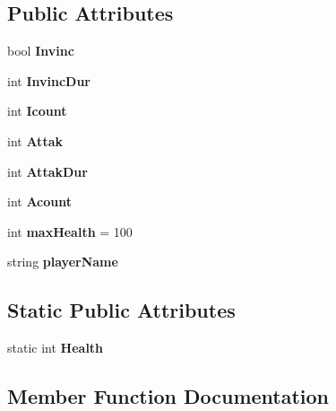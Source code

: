\subsection*{Public Attributes}
\begin{DoxyCompactItemize}
\item 
\mbox{\label{class_i_player_a52228afb290f3823a055ac7e1b62552f}} 
bool {\bfseries Invinc}
\item 
\mbox{\label{class_i_player_a9f3c711426886a5386599b37c1e7987e}} 
int {\bfseries Invinc\+Dur}
\item 
\mbox{\label{class_i_player_a4b8ca3067a4c9b973a01460be33a6aae}} 
int {\bfseries Icount}
\item 
\mbox{\label{class_i_player_a18da8ecdb8a63d0a93d75f6f59b719ef}} 
int {\bfseries Attak}
\item 
\mbox{\label{class_i_player_ace67debce789d1b103ae6f3c1d58561b}} 
int {\bfseries Attak\+Dur}
\item 
\mbox{\label{class_i_player_acd953caa4cbef2e580d8028a523036db}} 
int {\bfseries Acount}
\item 
\mbox{\label{class_i_player_a27e5fa4508d724dfc8c9e262a4e26ca1}} 
int {\bfseries max\+Health} = 100
\item 
\mbox{\label{class_i_player_a111ab23d1c1effff65699633e1508e6b}} 
string {\bfseries player\+Name}
\end{DoxyCompactItemize}
\subsection*{Static Public Attributes}
\begin{DoxyCompactItemize}
\item 
\mbox{\label{class_i_player_a5357d5c2fcd3f36a79c32071432cdc44}} 
static int {\bfseries Health}
\end{DoxyCompactItemize}


\subsection{Member Function Documentation}
\mbox{\label{class_i_player_a58a8e761b790450e9e190b3fdb5f2d29}} 
